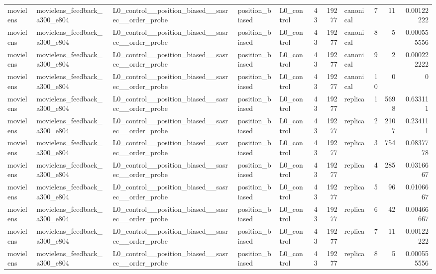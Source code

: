 \begin{table}[htbp!]
\begin{tabular}{lllllrrlrrr}
movielens & movielens\_feedback\_a300\_e804 & L0\_control\_\_position\_biased\_\_sasrec\_\_order\_probe & position\_biased & L0\_control & 43 & 19277 & canonical & 7 & 11 & 0.00122222 \\
movielens & movielens\_feedback\_a300\_e804 & L0\_control\_\_position\_biased\_\_sasrec\_\_order\_probe & position\_biased & L0\_control & 43 & 19277 & canonical & 8 & 5 & 0.000555556 \\
movielens & movielens\_feedback\_a300\_e804 & L0\_control\_\_position\_biased\_\_sasrec\_\_order\_probe & position\_biased & L0\_control & 43 & 19277 & canonical & 9 & 2 & 0.000222222 \\
movielens & movielens\_feedback\_a300\_e804 & L0\_control\_\_position\_biased\_\_sasrec\_\_order\_probe & position\_biased & L0\_control & 43 & 19277 & canonical & 10 & 0 & 0 \\
movielens & movielens\_feedback\_a300\_e804 & L0\_control\_\_position\_biased\_\_sasrec\_\_order\_probe & position\_biased & L0\_control & 43 & 19277 & replica & 1 & 5698 & 0.633111 \\
movielens & movielens\_feedback\_a300\_e804 & L0\_control\_\_position\_biased\_\_sasrec\_\_order\_probe & position\_biased & L0\_control & 43 & 19277 & replica & 2 & 2107 & 0.234111 \\
movielens & movielens\_feedback\_a300\_e804 & L0\_control\_\_position\_biased\_\_sasrec\_\_order\_probe & position\_biased & L0\_control & 43 & 19277 & replica & 3 & 754 & 0.0837778 \\
movielens & movielens\_feedback\_a300\_e804 & L0\_control\_\_position\_biased\_\_sasrec\_\_order\_probe & position\_biased & L0\_control & 43 & 19277 & replica & 4 & 285 & 0.0316667 \\
movielens & movielens\_feedback\_a300\_e804 & L0\_control\_\_position\_biased\_\_sasrec\_\_order\_probe & position\_biased & L0\_control & 43 & 19277 & replica & 5 & 96 & 0.0106667 \\
movielens & movielens\_feedback\_a300\_e804 & L0\_control\_\_position\_biased\_\_sasrec\_\_order\_probe & position\_biased & L0\_control & 43 & 19277 & replica & 6 & 42 & 0.00466667 \\
movielens & movielens\_feedback\_a300\_e804 & L0\_control\_\_position\_biased\_\_sasrec\_\_order\_probe & position\_biased & L0\_control & 43 & 19277 & replica & 7 & 11 & 0.00122222 \\
movielens & movielens\_feedback\_a300\_e804 & L0\_control\_\_position\_biased\_\_sasrec\_\_order\_probe & position\_biased & L0\_control & 43 & 19277 & replica & 8 & 5 & 0.000555556 \\

\end{tabular}
\end{table}
